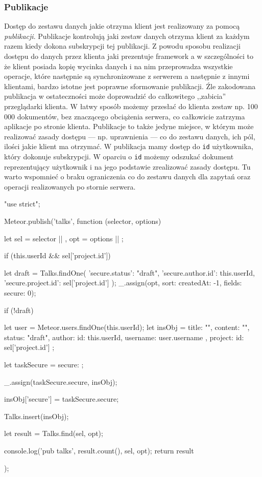   \subsubsection{Publikacje}
Dostęp do zestawu danych jakie otrzyma klient jest realizowany za pomocą \emph{publikacji}. Publikacje kontrolują jaki zestaw danych otrzyma klient za każdym razem kiedy dokona subskrypcji tej publikacji. Z powodu sposobu realizacji dostępu do danych przez klienta jaki prezentuje framework a w szczególności to że klient posiada kopię wycinka danych i na nim przeprowadza wszystkie operacje, które następnie są synchronizowane z serwerem a następnie z innymi klientami, bardzo istotne jest poprawne sformowanie publikacji. Źle zakodowana publikacja w ostateczności może doprowadzić do całkowitego ,,zabicia'' przeglądarki klienta. W łatwy sposób możemy przesłać do klienta zestaw np. 100 000 dokumentów, bez znaczącego obciążenia serwera, co całkowicie zatrzyma aplikacje po stronie klienta. Publikacje to także jedyne miejsce, w którym może realizować zasady dostępu --- np. uprawnienia --- co do zestawu danych, ich pól, ilości jakie klient ma otrzymać. W publikacja mamy dostęp do \verb|id| użytkownika, który dokonuje subskrypcji. W oparciu o \verb|id| możemy odszukać dokument reprezentujący użytkownik i na jego podstawie zrealizować zasady dostępu. Tu warto wspomnieć o braku ograniczenia co do zestawu danych dla zapytań oraz operacji realizowanych po stornie serwera. 
\begin{js}[caption={{Publikacja \textit{,,talks''} dla kolekcji Talks}},label={lst:talks_pub}]
"use strict";

Meteor.publish('talks', function (selector, options) {
    let sel = selector || {},
        opt = options || {};

    if (this.userId && sel['project.id']) {
        let draft = Talks.findOne({
            'secure.status': "draft",
            'secure.author.id': this.userId,
            'secure.project.id': sel['project.id']
        });
        _.assign(opt, {sort: {createdAt: -1}, fields: {secure: 0}});
        
        if (!draft) {
            let user = Meteor.users.findOne(this.userId);
            let insObj = {
                title: "",
                content: "",
                status: "draft",
                author: {
                    id: this.userId,
                    username: user.username
                },
                project: {
                    id:  sel['project.id']
                }
            };

            let taskSecure = {secure: {}};

            _.assign(taskSecure.secure, insObj);

            insObj['secure'] = taskSecure.secure;

            Talks.insert(insObj);
        }

        let result = Talks.find(sel, opt);

        console.log('pub talks', result.count(), sel, opt);
        return result
    }
});
\end{js}
